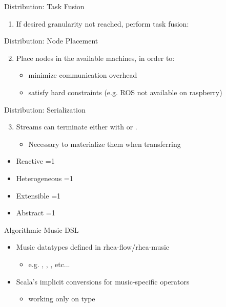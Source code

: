\documentclass{beamer}
\newcommand{\done}{\ding{51}}
\renewcommand\alert[1]{\textcolor{mLightBrown}{#1}}
\newcommand{\framepic}[1]{{\usebackgroundtemplate{%
  \texttt{[image: \#1]}}
	\begin{frame}{}\end{frame}
}}
\newcommand{\checklist}[4]{
  \begin{frame}[standout]
	  \begin{itemize}
    \item Reactive \ifnum #1=1 \done \fi
    \item Heterogeneous \ifnum #2=1 \done \fi
    \item Extensible \ifnum #3=1 \done \fi
    \item Abstract \ifnum #4=1 \done \fi
    \end{itemize}
  \end{frame}
}
\begin{document}
	\begin{frame}{Distribution: Task Fusion}
    \begin{enumerate}
    \item If desired granularity not reached, perform task fusion:
    \end{enumerate}	
   \end{frame}
    
  \begin{frame}{Distribution: Node Placement}
	  \begin{enumerate} \setcounter{enumi}{1}
	  \item Place nodes in the available machines, in order to:
		  \begin{itemize}
		  \item minimize communication overhead
		  \item satisfy hard constraints (e.g. ROS not available on raspberry)
		  \end{itemize}
	  \end{enumerate}
	\end{frame}
	
	\begin{frame}{Distribution: Serialization}
	  \begin{enumerate} \setcounter{enumi}{2}
	  \item Streams can terminate either with  or . 
	    \begin{itemize}
	    \item Necessary to materialize them when transferring
      \end{itemize}
	  \end{enumerate}
	\end{frame}
	
	\checklist{1}{1}{0}{1}

  \framepic{monty}
  
  \begin{frame}{Algorithmic Music DSL}
    \begin{itemize}
    \item Music datatypes defined in \alert{rhea-flow/rhea-music}
      \begin{itemize}
      \item e.g. , , , etc...
      \end{itemize}
    \item Scala's implicit conversions for music-specific operators
      \begin{itemize}
      \item working only on type 
      \end{itemize}
    \end{itemize}
  \end{frame}
  
\end{document}

